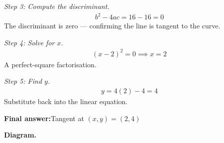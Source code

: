 \documentclass[11pt]{article}
\begin{document}
\textit{Step 3: Compute the discriminant.}
\[\begin{gathered}
b^2 - 4ac = 16 - 16 = 0
\end{gathered}\]
The discriminant is zero --- confirming the line is tangent to the curve.

\textit{Step 4: Solve for \( x \).}
\[\begin{gathered}
(x - 2)^2 = 0 \implies x = 2
\end{gathered}\]
A perfect-square factorisation.

\textit{Step 5: Find \( y \).}
\[\begin{gathered}
y = 4(2) - 4 = 4
\end{gathered}\]
Substitute back into the linear equation.

\begin{answerbox}
\textbf{Final answer:}\quad Tangent at \(\displaystyle (x, y) = (2, 4)\)
\end{answerbox}
\textbf{Diagram.}
\end{document}
